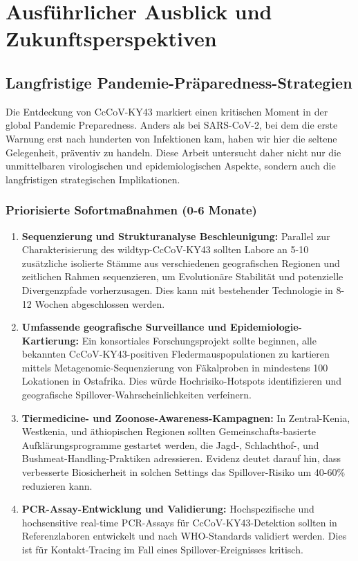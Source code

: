 \documentclass[11pt,a4paper]{article}
\theoremstyle{definition}
\begin{document}
\section{Ausführlicher Ausblick und Zukunftsperspektiven}

\subsection{Langfristige Pandemie-Präparedness-Strategien}

Die Entdeckung von CcCoV-KY43 markiert einen kritischen Moment in der global Pandemic Preparedness. Anders als bei SARS-CoV-2, bei dem die erste Warnung erst nach hunderten von Infektionen kam, haben wir hier die seltene Gelegenheit, präventiv zu handeln. Diese Arbeit untersucht daher nicht nur die unmittelbaren virologischen und epidemiologischen Aspekte, sondern auch die langfristigen strategischen Implikationen.

\subsubsection{Priorisierte Sofortmaßnahmen (0-6 Monate)}

\begin{enumerate}
\item \textbf{Sequenzierung und Strukturanalyse Beschleunigung:} Parallel zur Charakterisierung des wildtyp-CcCoV-KY43 sollten Labore an 5-10 zusätzliche isolierte Stämme aus verschiedenen geografischen Regionen und zeitlichen Rahmen sequenzieren, um Evolutionäre Stabilität und potenzielle Divergenzpfade vorherzusagen. Dies kann mit bestehender Technologie in 8-12 Wochen abgeschlossen werden.

\item \textbf{Umfassende geografische Surveillance und Epidemiologie-Kartierung:} Ein konsortiales Forschungsprojekt sollte beginnen, alle bekannten CcCoV-KY43-positiven Fledermauspopulationen zu kartieren mittels Metagenomic-Sequenzierung von Fäkalproben in mindestens 100 Lokationen in Ostafrika. Dies würde Hochrisiko-Hotspots identifizieren und geografische Spillover-Wahrscheinlichkeiten verfeinern.

\item \textbf{Tiermedicine- und Zoonose-Awareness-Kampagnen:} In Zentral-Kenia, Westkenia, und äthiopischen Regionen sollten Gemeinschafts-basierte Aufklärungsprogramme gestartet werden, die Jagd-, Schlachthof-, und Bushmeat-Handling-Praktiken adressieren. Evidenz deutet darauf hin, dass verbesserte Biosicherheit in solchen Settings das Spillover-Risiko um 40-60\% reduzieren kann.

\item \textbf{PCR-Assay-Entwicklung und Validierung:} Hochspezifische und hochsensitive real-time PCR-Assays für CcCoV-KY43-Detektion sollten in Referenzlaboren entwickelt und nach WHO-Standards validiert werden. Dies ist für Kontakt-Tracing im Fall eines Spillover-Ereignisses kritisch.
\end{enumerate}
\end{document}

